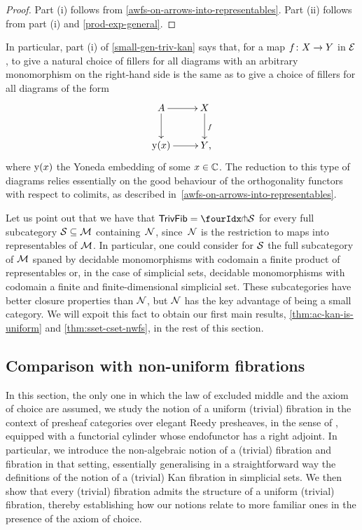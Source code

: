 \documentclass[reqno,10pt,a4paper,oneside]{amsart}
\begin{document}
\begin{proof} Part (i) follows from \cref{awfs-on-arrows-into-representables}.
Part (ii) follows from part (i) and \cref{prod-exp-general}.
\end{proof}

In particular, part (i) of \cref{small-gen-triv-kan} says that, for a map $f \co X \to Y$ in $\cal{E}$, to give a natural choice of fillers for all diagrams with an arbitrary monomorphism on the right-hand side is the same as to give a choice of fillers for all diagrams of the form
\[
\xymatrix{
A \ar[r] \ar[d] & X \ar[d]^f \\
\yon(x) \ar[r] & Y \rlap{,} }
\]
where $\yon(x)$ the Yoneda embedding of some $x \in \catC$.
The reduction to this type of diagrams relies essentially on the good behaviour of the orthogonality functors with respect to colimits, as described in~\cref{awfs-on-arrows-into-representables}.


\medskip

Let us point out that we have that $\mathsf{TrivFib} = \liftr{\cal{S}}$ for every full subcategory $\cal{S} \subseteq \cal{M}$ containing~$\cal{N}$, since~$\cal{N}$ is the restriction to maps into representables of $\cal{M}$.
In particular, one could consider for
$\cal{S}$ the full subcategory of $\cal{M}$ spaned by decidable monomorphisms with codomain a finite product of representables or, in the case of simplicial sets, decidable monomorphisms with codomain a finite and finite-dimensional simplicial set.
These subcategories have better closure properties than $\cal{N}$, but $\cal{N}$ has the key advantage of being a small category.
We will expoit this fact to obtain our first main results, \cref{thm:ac-kan-is-uniform} and \cref{thm:sset-cset-nwfs}, in the rest of this section.


\subsection*{Comparison with non-uniform fibrations}
In this section, the only one in which the law of excluded middle and the axiom of choice are assumed, we study the notion of a uniform (trivial) fibration in the context of presheaf categories over elegant Reedy presheaves, in the sense of \cite{bergner-rezk-elegant}, equipped with a functorial cylinder whose endofunctor has a right adjoint.
In particular, we introduce the non-algebraic notion of a (trivial) fibration and fibration in that setting, essentially generalising in a straightforward way the definitions of the notion of a (trivial) Kan fibration in simplicial sets.
We then show that every (trivial) fibration admits the structure of a uniform (trivial) fibration, thereby establishing how our notions relate to more familiar ones in the presence of the axiom of choice.
\end{document}
